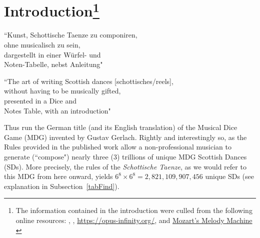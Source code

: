 \documentclass[a4paper,x11names,svgnames,10pt]{article}
\begin{document}
{\section[Introduction]{Introduction\footnote{The information contained in the introduction were culled from the following online resources:
	\citet{gg1830}, 
	\citet{wiki_mw2017},
	\url{https://opus-infinity.org/}, and 
	\href{https://www.sciencenews.org/article/mozarts-melody-machine-0}{Mozart's Melody Machine} \citep*{peterson2001}
	}
}
	\begin{center}
	\begin{minipage}{0.4\textwidth}
	\begin{flushleft}
		\begin{center}
			``\small Kunst, Schottische Taenze zu componiren, \\
			ohne musicalisch zu sein, \\
			dargestellt in einer Würfel- und \\
			Noten-Tabelle, nebst Anleitung"
		\end{center}
	\end{flushleft}
	\end{minipage}
	\begin{minipage}{0.4\textwidth}
	\begin{flushright}
		\begin{center}
		``\small The art of writing Scottish dances [schottisches/reels], \\
		without having to be musically gifted, \\
		presented in a Dice and \\ 
		Notes Table, with an introduction"
	\end{center}
	\end{flushright}
	\end{minipage}
	\end{center}

Thus run the German title (and its English translation) of the Musical Dice Game (MDG) invented by Gustav Gerlach.  Rightly and interestingly so, as the Rules provided in the published work allow a non-professional musician to generate (``compose") nearly three (3) trillions of unique MDG Scottish Dances (SDs).  More precisely, the rules of the {\it Schottische Taenze}, as we would refer to this MDG from here onward, yields $6^{8} \times 6^{8} = 2,\!821,\!109,\!907,\!456$ unique SDs (see explanation in Subsection~\ref{tabFind}).\\  %

}
\end{document}
